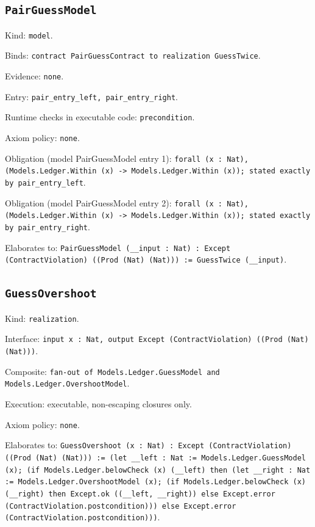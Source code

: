 \documentclass[11pt]{article}
\begin{document}
\subsection*{\texttt{PairGuessModel}}
\noindent Kind: \texttt{model}.\par
\noindent Binds: \texttt{contract PairGuessContract to realization GuessTwice}.\par
\noindent Evidence: \texttt{none}.\par
\noindent Entry: \texttt{pair\_entry\_left, pair\_entry\_right}.\par
\noindent Runtime checks in executable code: \texttt{precondition}.\par
\noindent Axiom policy: \texttt{none}.\par
\noindent Obligation (model PairGuessModel entry 1): \texttt{forall (x : Nat), (Models.Ledger.Within (x) -> Models.Ledger.Within (x)); stated exactly by pair\_entry\_left}.\par
\noindent Obligation (model PairGuessModel entry 2): \texttt{forall (x : Nat), (Models.Ledger.Within (x) -> Models.Ledger.Within (x)); stated exactly by pair\_entry\_right}.\par
\noindent Elaborates to: \texttt{PairGuessModel (\_\_input : Nat) : Except (ContractViolation) ((Prod (Nat) (Nat))) := GuessTwice (\_\_input)}.\par
\subsection*{\texttt{GuessOvershoot}}
\noindent Kind: \texttt{realization}.\par
\noindent Interface: \texttt{input x : Nat, output Except (ContractViolation) ((Prod (Nat) (Nat)))}.\par
\noindent Composite: \texttt{fan-out of Models.Ledger.GuessModel and Models.Ledger.OvershootModel}.\par
\noindent Execution: executable, non-escaping closures only.\par
\noindent Axiom policy: \texttt{none}.\par
\noindent Elaborates to: \texttt{GuessOvershoot (x : Nat) : Except (ContractViolation) ((Prod (Nat) (Nat))) := (let \_\_left : Nat := Models.Ledger.GuessModel (x); (if Models.Ledger.belowCheck (x) (\_\_left) then (let \_\_right : Nat := Models.Ledger.OvershootModel (x); (if Models.Ledger.belowCheck (x) (\_\_right) then Except.ok ((\_\_left, \_\_right)) else Except.error (ContractViolation.postcondition))) else Except.error (ContractViolation.postcondition)))}.\par
\end{document}
